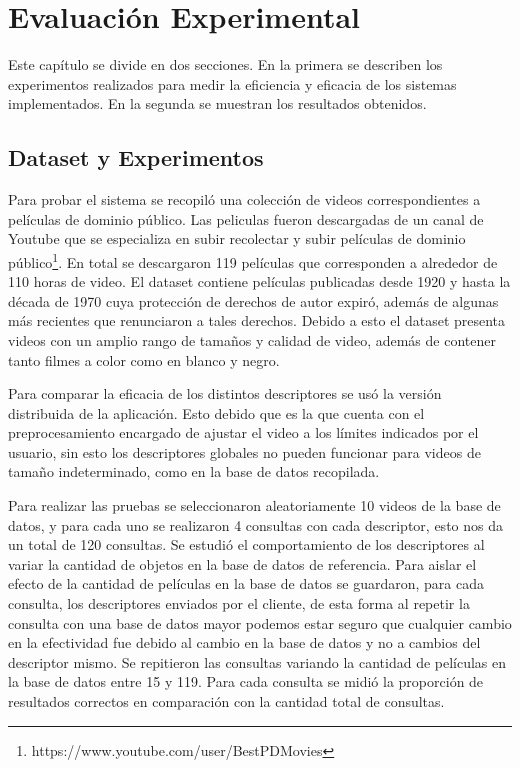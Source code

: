 \chapter{Evaluación Experimental} \label{evaluacion}
Este capítulo se divide en dos secciones. En la primera se describen los experimentos realizados para medir la eficiencia y eficacia de los sistemas implementados. En la segunda se muestran los resultados obtenidos.

\section{Dataset y Experimentos}\label{experimentos}
Para probar el sistema se recopiló una colección de videos correspondientes a películas de dominio público. Las peliculas fueron descargadas de un canal de Youtube que se especializa en subir recolectar y subir películas de dominio público\footnote{https://www.youtube.com/user/BestPDMovies}. En total se descargaron 119 películas que corresponden a alrededor de 110 horas de video. El dataset contiene películas publicadas desde 1920 y hasta la década de 1970 cuya protección de derechos de autor expiró, además de algunas más recientes que renunciaron a tales derechos. Debido a esto el dataset presenta videos con un amplio rango de tamaños y calidad de video, además de contener tanto filmes a color como en blanco y negro. 

Para comparar la eficacia de los distintos descriptores se usó la versión distribuida de la aplicación. Esto debido que es la que cuenta con el preprocesamiento encargado de ajustar el video a los límites indicados por el usuario, sin esto los descriptores globales no pueden funcionar para videos de tamaño indeterminado, como en la base de datos recopilada.

Para realizar las pruebas se seleccionaron aleatoriamente 10 videos de la base de datos, y para cada uno se realizaron 4 consultas con cada descriptor, esto nos da un total de 120 consultas. Se estudió el comportamiento de los descriptores al variar la cantidad de objetos en la base de datos de referencia. Para aislar el efecto de la cantidad de películas en la base de datos se guardaron, para cada consulta, los descriptores enviados por el cliente, de esta forma al repetir la consulta con una base de datos mayor podemos estar seguro que cualquier cambio en la efectividad fue debido al cambio en la base de datos y no a cambios del descriptor mismo. Se repitieron las consultas variando la cantidad de películas en la base de datos entre 15 y 119. Para cada consulta se midió la proporción de resultados correctos en comparación con la cantidad total de consultas.

